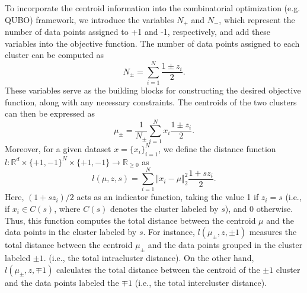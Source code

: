 \documentclass[showpacs,twocolumn,superscriptaddress]{revtex4-2}
\begin{document}
To incorporate the centroid information into the combinatorial optimization (e.g. QUBO) framework, we introduce the variables $N_{+}$ and $N_{-}$, which represent the number of data points assigned to +1 and -1, respectively, and add these variables into the objective function. The number of data points assigned to each cluster can be computed as
\begin{equation}
     N_{\pm} = \sum_{i=1}^{N}\frac{1\pm z_i}{2}.
\end{equation}
These variables serve as the building blocks for constructing the desired objective function, along with any necessary constraints. The centroids of the two clusters can then be expressed as
\begin{equation}
\label{centroid}
     \mu_{\pm} = \frac{1}{N_{\pm}}\sum_{i=1}^{N}x_i\frac{1\pm z_i}{2}.
\end{equation}
Moreover, for a given dataset $x=\lbrace x_i\rbrace_{i=1}^N$, we define the distance function $l:\mathbb{R}^d\times \lbrace +1,-1\rbrace^{N}\times \lbrace +1,-1\rbrace \rightarrow \mathbb{R}_{\ge 0}$ as
\begin{equation}
\label{eq:centroid_loss}
    l(\mu,z,s) = \sum_{i=1}^N \Vert x_i - \mu\Vert_2 ^2\frac{1+ s z_i}{2}.
\end{equation}
Here, $(1+sz_i)/2$ acts as an indicator function, taking the value 1 if $z_i =s$ (i.e., if $x_i\in C(s)$, where $C(s)$ denotes the cluster labeled by $s$), and 0 otherwise. Thus, this function computes the total distance between the centroid $\mu$ and the data points in the cluster labeled by $s$. For instance, $l(\mu_{\pm},z,\pm 1)$ measures the total distance between the centroid $\mu_{\pm}$ and the data points grouped in the cluster labeled $\pm 1$. (i.e., the total intracluster distance). On the other hand, $l(\mu_{\pm},z,\mp 1)$ calculates the total distance between the centroid of the $\pm 1$ cluster and the data points labeled the $\mp 1$ (i.e., the total intercluster distance).
\end{document}
